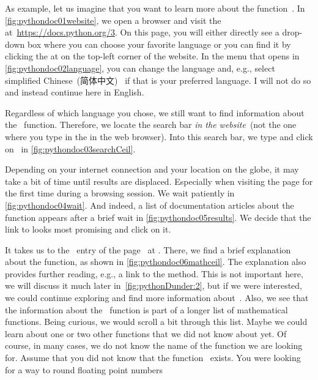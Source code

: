 As example, let us imagine that you want to learn more about the function~.
In \cref{fig:pythondoc01website}, we open a browser and visit the ~\cite{PSF:P3D} at~\url{https://docs.python.org/3}.
On this page, you will either directly see a drop-down box where you can choose your favorite language or you can find it by clicking the \menu{\threeBarButton} at on the top-left corner of the website.
In the menu that opens in \cref{fig:pythondoc02language}, you can change the language and, e.g., select simplified Chinese~(简体中文)~\cite{SCR1956ROTSCOPTSCCS1} if that is your preferred language.
I will not do so and instead continue here in English.

Regardless of which language you chose, we still want to find information about the ~function.
Therefore, we locate the search bar \emph{in the website}~(not the one where you type in the  in the web browser).
Into this search bar, we type  and click on~ in \cref{fig:pythondoc03searchCeil}.

Depending on your internet connection and your location on the globe, it may take a bit of time until results are displaced.
Especially when visiting the page for the first time during a browsing session.
We wait patiently in \cref{fig:pythondoc04wait}.
And indeed, a list of documentation articles about the  function appears after a brief wait in \cref{fig:pythondoc05results}.
We decide that the link to  looks most promising and click on it.

It takes us to the ~entry of the  page~\cite{PSF:P3D:TPSL:MMF} at .
There, we find a brief explanation about the  function, as shown in \cref{fig:pythondoc06mathceil}.
The explanation also provides further reading, e.g., a link to the  method.
This is not important here, we will discuss it much later in~\cref{fig:pythonDunder:2}, but if we were interested, we could continue exploring and find more information about~.
Also, we see that the information about the ~function is part of a longer list of mathematical functions.
Being curious, we would scroll a bit through this list.
Maybe we could learn about one or two other functions that we did not know about yet.%
%
%
%
Of course, in many cases, we do not know the name of the function we are looking for.
Assume that you did not know that the function~ exists.
You were looking for a way to round floating point numbers 

